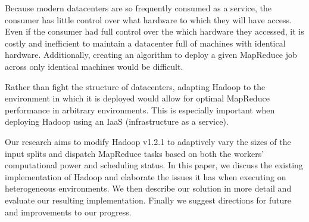 \documentclass{sig-alternate}
\begin{document}
Because modern datacenters are so frequently consumed as a service, the consumer
has little control over what hardware to which they will have access. Even if the
consumer had full control over the which hardware they accessed, it is costly and
inefficient to maintain a datacenter full of machines with identical hardware. 
Additionally, creating an algorithm to deploy a given MapReduce job across only 
identical machines would be difficult.

Rather than fight the structure of datacenters, adapting Hadoop to the environment
in which it is deployed would allow for optimal MapReduce performance in arbitrary
environments. This is especially important when deploying Hadoop using an IaaS 
(infrastructure as a service).

Our research aims to modify Hadoop v1.2.1 to adaptively vary the sizes of the input
splits and dispatch MapReduce tasks based on both the workers' computational power
and scheduling status. In this paper, we discuss the existing implementation of Hadoop
and elaborate the issues it has when executing on heterogeneous environments. We then
describe our solution in more detail and evaluate our resulting implementation. Finally
we suggest directions for future and improvements to our progress.








{}

\end{document}
